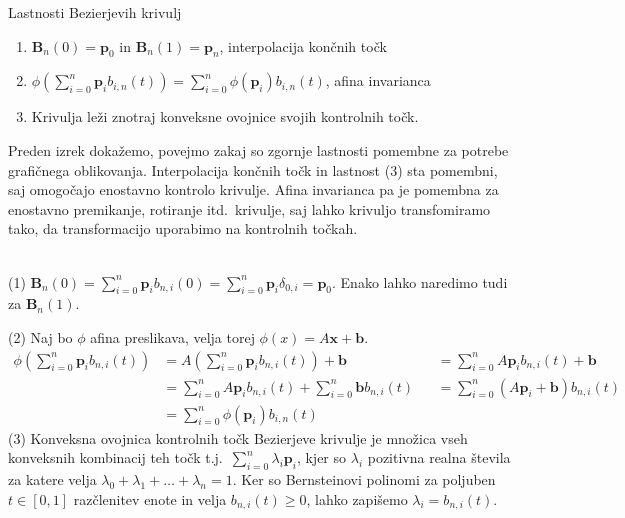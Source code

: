 \documentclass[isrm2, tisk]{fmfdelo}
\newcommand{\p}{\textbf{p}}
\newcommand{\lilb}[2]{b_{#1,#2}(t)}
\newcommand{\bigbbod}[2]{\textbf{B}_{#1}(#2)}
\newcommand{\bernsteinsump}[2]{\sum_{#1=0}^{#2} \p_{#1}\lilb{#1}{#2}}
\newcommand{\bernsteinsumtritri}[3]{\sum_{#1=0}^{#2} #3\lilb{#1}{#2}}
\begin{document}
    \begin{izrek}{Lastnosti Bezierjevih krivulj}
        \begin{enumerate}
            \item $\bigbbod{n}{0}=\p_0$ in $\bigbbod{n}{1}=\p_n$, interpolacija končnih točk
            \item $\phi(\bernsteinsump{i}{n}) =\bernsteinsumtritri{i}{n}{\phi(\p_i)}$, afina invarianca
            \item Krivulja leži znotraj konveksne ovojnice svojih kontrolnih točk.
        \end{enumerate}
    \end{izrek}
    Preden izrek dokažemo, povejmo zakaj so zgornje lastnosti pomembne za potrebe grafičnega oblikovanja.
    Interpolacija končnih točk in lastnost (3) sta pomembni, saj omogočajo enostavno kontrolo krivulje.
    Afina invarianca pa je pomembna za enostavno premikanje, rotiranje itd.\ krivulje, saj lahko krivuljo transfomiramo tako, da transformacijo uporabimo na kontrolnih točkah.


    \begin{dokaz}
        ~\\
        \noindent (1) $\bigbbod{n}{0}=\sum_{i=0}^{n}\p_{i}b_{n,i}(0) = \sum_{i=0}^{n}\p_{i}\delta_{0,i} = \p_0$.
        Enako lahko naredimo tudi za $\bigbbod{n}{1}.$

        \noindent (2) Naj bo $\phi$ afina preslikava, velja torej $\phi(x) = A\mathbf{x} + \mathbf{b}.$
        \begin{align*}
            \phi\left(\sum_{i=0}^{n}\p_{i}b_{n,i}(t)\right) &= A\left(\sum_{i=0}^{n}\p_{i}b_{n,i}(t)\right) + \mathbf{b} &&=  \sum_{i=0}^{n}A\p_{i}b_{n,i}(t) + \mathbf{b}  \\
            &= \sum_{i=0}^{n}A\p_{i}b_{n,i}(t) + \sum_{i=0}^{n}\mathbf{b}b_{n,i}(t) &&= \sum_{i=0}^{n}(A\p_{i}+\mathbf{b})b_{n,i}(t) \\
            &= \bernsteinsumtritri{i}{n}{\phi(\p_i)}
        \end{align*}
        \noindent (3) Konveksna ovojnica kontrolnih točk Bezierjeve krivulje je množica vseh konveksnih kombinacij teh točk t.j.\ $\sum_{i=0}^{n}\lambda_i\p_{i}$, kjer so $\lambda_i$ pozitivna realna števila za katere velja $\lambda_0 + \lambda_1 + \dots + \lambda_n = 1$.
        Ker so Bernsteinovi polinomi za poljuben $t\in[0,1]$ razčlenitev enote in velja $\lilb{n}{i}\geq0$, lahko zapišemo $\lambda_i=\lilb{n}{i}$.
    \end{dokaz}
\end{document}
